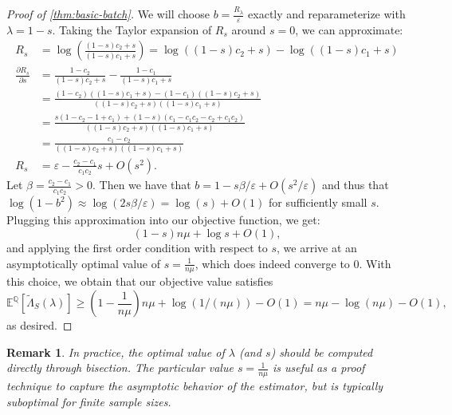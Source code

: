 \documentclass{article}
\newcommand{\Alt}{\mathbb{Q}}
\newcommand{\eps}{\varepsilon}
\newtheorem{remark}{Remark}[section]
\begin{document}
\begin{proof}[Proof of \cref{thm:basic-batch}]
    We will choose $b = \frac{R_\lambda}{\varepsilon}$ exactly and reparameterize with $\lambda = 1 - s$. Taking the Taylor expansion of $R_s$ around $s=0$, we can approximate:
    \begin{align*}
        R_s &= \log\left( \frac{(1-s)c_2 + s}{(1-s)c_1 + s} \right) 
        = \log((1-s)c_2 + s) - \log((1-s)c_1 + s) \\
        \frac{\partial R_s}{\partial s} &=
        \frac{1-c_2}{(1-s)c_2 + s} - \frac{1-c_1}{(1-s)c_1 + s} \\
        &= \frac{(1-c_2)((1-s)c_1 + s) - (1-c_1)((1-s)c_2 + s)}{((1-s)c_2 + s)((1-s)c_1 + s)} \\
        &= \frac{s(1 - c_2 - 1 + c_1) + (1-s)(c_1 - c_1c_2 - c_2 + c_1c_2)}{((1-s)c_2 + s)((1-s)c_1 + s)} \\
        &= \frac{c_1-c_2}{((1-s)c_2 + s)((1-s)c_1 + s)} \\
        R_s &= \eps - \frac{c_2-c_1}{c_1c_2}s + O(s^2).
    \end{align*}
    Let $\beta = \frac{c_2-c_1}{c_1c_2} > 0$. Then we have that $b = 1 - s\beta/\eps + O(s^2/\eps)$ and thus that $\log(1-b^2) \approx \log(2s\beta/\eps) = \log(s) + O(1)$ for sufficiently small $s$. Plugging this approximation into our objective function, we get:
    \begin{equation*}
        (1-s)n\mu + \log s + O(1),
    \end{equation*}
    and applying the first order condition with respect to $s$, we arrive at an asymptotically optimal value of $s = \frac{1}{n\mu}$, which does indeed converge to 0. With this choice, we obtain that our objective value satisfies
    \begin{equation*}
        \mathbb{E}^\Alt[\tilde \Lambda_S(\lambda)] \geq \left(1-\frac{1}{n\mu}\right) n\mu + \log(1/(n\mu)) - O(1)
        = n\mu - \log(n\mu) - O(1),
    \end{equation*}
    as desired.
\end{proof}

\begin{remark}
    In practice, the optimal value of $\lambda$ (and $s$) should be computed directly through bisection. The particular value $s = \frac{1}{n\mu}$ is useful as a proof technique to capture the asymptotic behavior of the estimator, but is typically suboptimal for finite sample sizes.
\end{remark}

\vspace{1cm}
\end{document}
